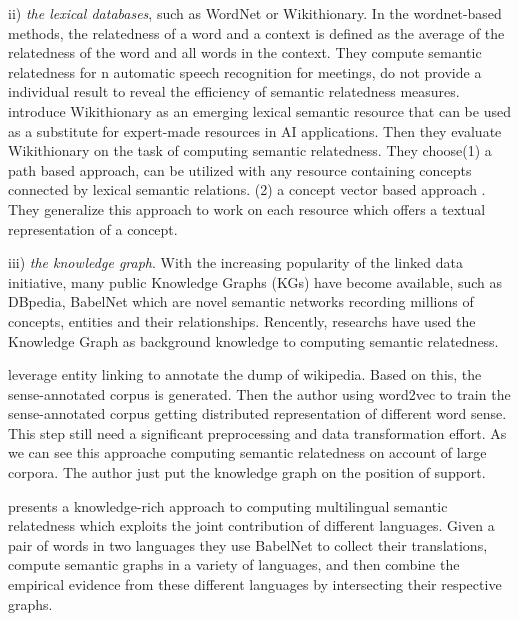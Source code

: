 ii) \emph{the lexical databases}, such as WordNet or Wikithionary. 
In the wordnet-based methods\cite{acl/Pucher07}, the relatedness of a word and a context is
defined as the average of the relatedness of the word and all words in the context. They compute
semantic relatedness for n automatic speech recognition for meetings, do not provide a individual result
to reveal the efficiency of semantic relatedness measures.
\cite{aaai/ZeschMG08} introduce Wikithionary as an emerging lexical semantic resource
that can be used as a substitute for expert-made resources in AI applications.
Then they evaluate Wikithionary on the task of computing semantic relatedness.
They choose(1) a path based approach\cite{its/Rada89}, can be utilized with any
resource containing concepts connected by lexical semantic relations. (2) a concept vector based approach
\cite{ijcai/GabrilovichM07}. They generalize this approach to work on each
resource which offers a textual representation of a concept.

iii) \emph{the knowledge graph}. 
With the increasing popularity of the linked data initiative, many public Knowledge Graphs (KGs) have
become available, such as DBpedia, BabelNet which are novel semantic networks recording millions
of concepts, entities and their relationships. Rencently, researchs have used the Knowledge Graph as
background knowledge to computing semantic relatedness. 

\cite{acl/IacobacciPN15} leverage entity linking to annotate the dump of wikipedia. Based on this,
the sense-annotated corpus is generated. Then the author using word2vec to
train the sense-annotated corpus getting distributed representation of different 
word sense. This step still need a significant preprocessing and data transformation effort. 
As we can see this approache computing semantic relatedness on account of large corpora.
The author just put the knowledge graph on the position of support. 

\cite{aaai/NavigliP12} presents a knowledge-rich approach to computing multilingual semantic
relatedness which exploits the joint contribution of different languages. Given a pair of words 
in two languages they use BabelNet to collect their translations, compute semantic
graphs in a variety of languages, and then combine the empirical evidence from these 
different languages by intersecting their respective graphs.


